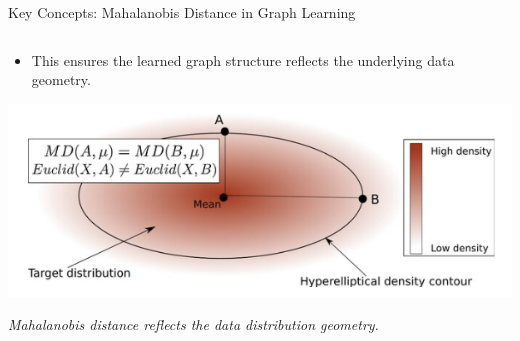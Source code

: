 \documentclass[aspectratio=169,xcolor=dvipsnames]{beamer}
\begin{document}
\begin{frame}{Key Concepts: Mahalanobis Distance in Graph Learning}
\begin{columns}[c]
\begin{column}{0.55\textwidth}
\begin{itemize}
    
    \item This ensures the learned graph structure reflects the underlying data geometry.
\end{itemize}


\begin{center}
    \includegraphics[width=0.7\linewidth]{Mahalanobis.png}
    
    \tiny \textit{Mahalanobis distance reflects the data distribution geometry.}
\end{center}

\end{column}

\end{columns}

\end{frame}
\end{document}
